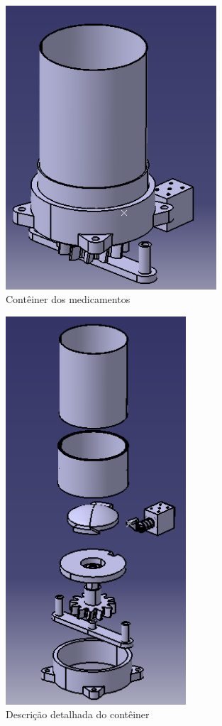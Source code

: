 \begin{apendicesenv}
\begin{figure}[H]
    \centering
    \includegraphics[width=0.7\textwidth]{figuras/estrutura/Conteiner.png}
    \caption{Contêiner dos medicamentos}
    \label{fig:conteiner}
\end{figure}

\begin{figure}[H]
    \centering
    \includegraphics[width=0.6\textwidth]{figuras/estrutura/Descrição Contêiner.png}
    \caption{Descrição detalhada do contêiner}
    \label{fig:DescricaoConteiner}
\end{figure}


\end{apendicesenv}
